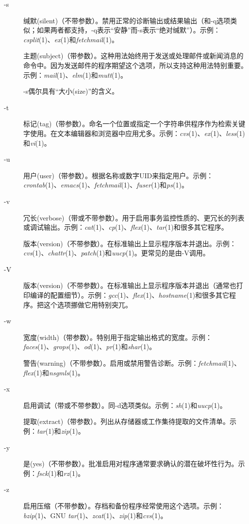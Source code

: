 \documentclass[12pt,oneside]{book}
\begin{document}
\begin{description}
\item[-s] 缄默(silent)（不带参数）。禁用正常的诊断输出或结果输出（和-q选项类似；如果两者都支持，-q表示“安静”而-s表示“绝对缄默”）。示例：\textit{csplit}(1)、\textit{ex}(1)和\textit{fetchmail}(1)。

主题(subject)（带参数）。这种用法始终用于发送或处理邮件或新闻消息的命令中。因为发送邮件的程序期望这个选项，所以支持这种用法特别重要。示例：\textit{mail}(1)、\textit{elm}(1)和\textit{mutt}(1)。

-s偶尔具有“大小(size)”的含义。

\item[-t] 标记(tag)（带参数）。命名一个位置或指定一个字符串供程序作为检索关键字使用。在文本编辑器和浏览器中应用尤多。示例：\textit{cvs}(1)、\textit{ex}(1)、\textit{less}(1)和\textit{vi}(1)。

\item[-u] 用户(user)（带参数）。根据名称或数字UID来指定用户。示例：\textit{crontab}(1)、\textit{emacs}(1)、\textit{fetchmail}(1)、\textit{fuser}(1)和\textit{ps}(1)。

\item[-v] 冗长(verbose)（带或不带参数）。用于启用事务监控性质的、更冗长的列表或调试输出。示例：\textit{cat}(1)、\textit{cp}(1)、\textit{flex}(1)、\textit{tar}(1)和很多其它程序。

版本(version)（不带参数）。在标准输出上显示程序版本并退出。示例：\textit{cvs}(1)、\textit{chattr}(1)、\textit{patch}(1)和\textit{uucp}(1)。更常见的是由-V调用。

\item[-V] 版本(version)（不带参数）。在标准输出上显示程序版本并退出（通常也打印编译的配置细节）。示例：\textit{gcc}(1)、\textit{flex}(1)、\textit{hostname}(1)和很多其它程序。把这个选项挪做它用特别突兀。

\item[-w] 宽度(width)（带参数）。特别用于指定输出格式的宽度。示例：\\ \textit{faces}(1)、\textit{grops}(1)、\textit{od}(1)、\textit{pr}(1)和\textit{shar}(1)。

警告(warning)（不带参数）。启用或禁用警告诊断。示例：\textit{fetchmail}(1)、\textit{flex}(1)和\textit{nsgmls}(1)。

\item[-x] 启用调试（带或不带参数）。同-d选项类似。示例：\textit{sh}(1)和\textit{uucp}(1)。
    
提取(extract)（带参数）。列出从存储器或工作集待提取的文件清单。示例：\textit{tar}(1)和\textit{zip}(1)。

\item[-y] 是(yes)（不带参数）。批准启用对程序通常要求确认的潜在破坏性行为。示例：\textit{fsck}(1)和\textit{rz}(1)。

\item[-z] 启用压缩（不带参数）。存档和备份程序经常使用这个选项。示例：\textit{bzip}(1)、GNU \textit{tar}(1)、\textit{zcat}(1)、\textit{zip}(1)和\textit{cvs}(1)。
\end{description}
\end{document}
